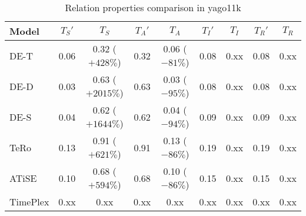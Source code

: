 \begin{table*}[htb]
\centering
\begin{minipage}{0.95\textwidth}
\centering
\caption{Relation properties comparison in yago11k}
\vspace{-3mm}

\begin{tabular}{l|cc|cc|cc|cc}\hline
Model       & $T_S'$ & $T_S$ & $T_A'$ & $T_A$ & $T_I'$ & $T_I$ & $T_R'$ & $T_R$ \\ \hline
DE-T & 0.06 & 0.32 (\textcolor{textgreen}{$+428\%$}) & 0.32 & 0.06 (\textcolor{textred}{$-81\%$}) & 0.08 & 0.xx & 0.08 & 0.xx \\ 
DE-D & 0.03 & 0.63 (\textcolor{textgreen}{$+2015\%$}) & 0.63 & 0.03 (\textcolor{textred}{$-95\%$}) & 0.08 & 0.xx & 0.08 & 0.xx \\ 
DE-S & 0.04 & 0.62 (\textcolor{textgreen}{$+1644\%$}) & 0.62 & 0.04 (\textcolor{textred}{$-94\%$}) & 0.09 & 0.xx & 0.09 & 0.xx \\ 
TeRo & 0.13 & 0.91 (\textcolor{textgreen}{$+621\%$}) & 0.91 & 0.13 (\textcolor{textred}{$-86\%$}) & 0.19 & 0.xx & 0.19 & 0.xx \\ 
ATiSE & 0.10 & 0.68 (\textcolor{textgreen}{$+594\%$}) & 0.68 & 0.10 (\textcolor{textred}{$-86\%$}) & 0.15 & 0.xx & 0.15 & 0.xx \\ 
TimePlex & 0.xx & 0.xx & 0.xx & 0.xx & 0.xx & 0.xx & 0.xx & 0.xx \\ 
 \hline
\end{tabular}

\label{fig:relation_properties_yago11k_comparison}
\end{minipage}
\end{table*}

